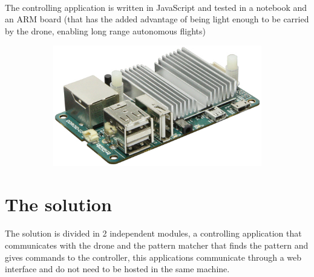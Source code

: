 \documentclass[11pt,twoside,a4paper]{article}
\begin{document}
\paragraph {} The controlling application is written in JavaScript and tested
in a notebook and an ARM board (that has the added advantage of being light
enough to be carried by the drone, enabling long range autonomous flights)
\begin{figure}[hbtp]
  \centering
\begin{subfigure}{.99\textwidth}
  \centering
  \includegraphics[width=.8\linewidth]{odroid.jpg}
\end{subfigure}
\end{figure}

\section{The solution}
\paragraph {} The solution is divided in 2 independent modules, a controlling
application that communicates with the drone and the pattern matcher that
finds the pattern and gives commands to the controller, this applications
communicate through a web interface and do not need to be hosted in the same
machine.
\end{document}
